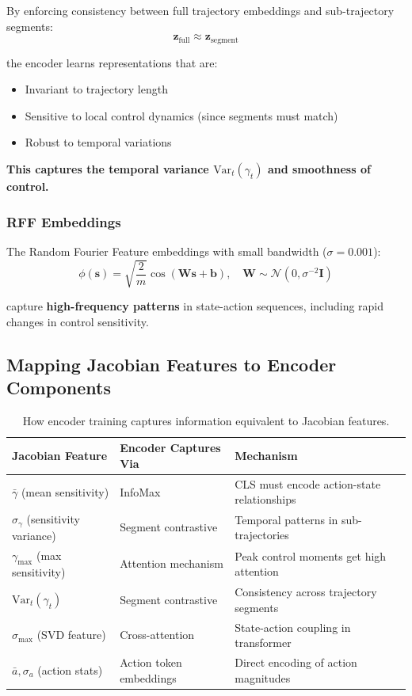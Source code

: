 \documentclass[11pt,a4paper]{article}
\newcommand{\vect}[1]{\mathbf{#1}}
\newcommand{\mat}[1]{\mathbf{#1}}
\begin{document}
By enforcing consistency between full trajectory embeddings and sub-trajectory segments:
\begin{equation}
    \vect{z}_{\text{full}} \approx \vect{z}_{\text{segment}}
\end{equation}

the encoder learns representations that are:
\begin{itemize}
    \item Invariant to trajectory length
    \item Sensitive to local control dynamics (since segments must match)
    \item Robust to temporal variations
\end{itemize}

\textbf{This captures the temporal variance $\text{Var}_t(\gamma_t)$ and smoothness of control.}

\subsubsection{RFF Embeddings}

The Random Fourier Feature embeddings with small bandwidth ($\sigma = 0.001$):
\begin{equation}
    \phi(\vect{s}) = \sqrt{\frac{2}{m}} \cos(\mat{W} \vect{s} + \vect{b}), \quad \mat{W} \sim \mathcal{N}(0, \sigma^{-2} \mat{I})
\end{equation}

capture \textbf{high-frequency patterns} in state-action sequences, including rapid changes in control sensitivity.

\subsection{Mapping Jacobian Features to Encoder Components}

\begin{table}[h]
\centering
\begin{tabular}{@{}lll@{}}
\toprule
\textbf{Jacobian Feature} & \textbf{Encoder Captures Via} & \textbf{Mechanism} \\
\midrule
$\bar{\gamma}$ (mean sensitivity) & InfoMax & CLS must encode action-state relationships \\
$\sigma_\gamma$ (sensitivity variance) & Segment contrastive & Temporal patterns in sub-trajectories \\
$\gamma_{\max}$ (max sensitivity) & Attention mechanism & Peak control moments get high attention \\
$\text{Var}_t(\gamma_t)$ & Segment contrastive & Consistency across trajectory segments \\
$\sigma_{\max}$ (SVD feature) & Cross-attention & State-action coupling in transformer \\
$\bar{a}, \sigma_a$ (action stats) & Action token embeddings & Direct encoding of action magnitudes \\
\bottomrule
\end{tabular}
\caption{How encoder training captures information equivalent to Jacobian features.}
\end{table}
\end{document}
